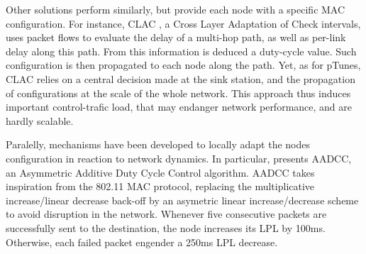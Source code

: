\documentclass[12pt,journal,compsoc]{IEEEtran}
\begin{document}
Other solutions perform similarly, but provide each node with a specific MAC configuration. For instance, CLAC \cite{ecc12cross}, a Cross Layer Adaptation of Check intervals, uses packet flows to evaluate the delay of a multi-hop path, as well as per-link delay along this path. From this information is deduced a duty-cycle value. Such configuration is then propagated to each node along the path. Yet, as for pTunes, CLAC relies on a central decision made at the sink station, and the propagation of configurations at the scale of the whole network. This approach thus induces important control-trafic load, that may endanger network performance, and are hardly scalable.


Paralelly, mechanisms have been developed to locally adapt the nodes configuration in reaction to network dynamics. In particular, \cite{mh10duty} presents AADCC, an Asymmetric Additive Duty Cycle Control algorithm.
AADCC takes inspiration from the 802.11 MAC protocol, replacing the multiplicative increase/linear decrease back-off by an asymetric linear increase/decrease scheme to avoid disruption in the network. Whenever five consecutive packets are successfully sent to the destination, the node increases its LPL by 100ms. Otherwise, each failed packet engender a 250ms LPL decrease. 



\end{document}
